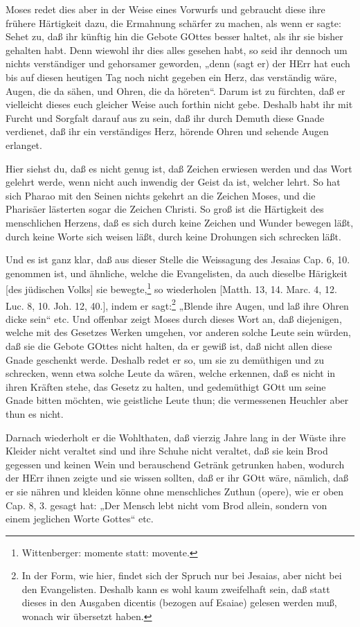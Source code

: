 Moses redet dies aber in der Weise eines Vorwurfs und gebraucht diese ihre frühere Härtigkeit dazu, die Ermahnung schärfer zu machen, als wenn er sagte: Sehet zu, daß ihr künftig hin die Gebote GOttes besser haltet, als ihr sie bisher gehalten habt. Denn wiewohl ihr dies alles gesehen habt, so seid ihr dennoch um nichts verständiger und gehorsamer geworden, „denn (sagt er) der HErr hat euch bis auf diesen heutigen Tag noch nicht gegeben ein Herz, das verständig wäre, Augen, die da sähen, und Ohren, die da höreten“. Darum ist zu fürchten, daß er vielleicht dieses euch gleicher Weise auch forthin nicht gebe. Deshalb habt ihr mit Furcht und Sorgfalt darauf aus zu sein, daß ihr durch Demuth diese Gnade verdienet, daß ihr ein verständiges Herz, hörende Ohren und sehende Augen erlanget.

Hier siehst du, daß es nicht genug ist, daß Zeichen erwiesen werden und das Wort gelehrt werde, wenn nicht auch inwendig der Geist da ist, welcher lehrt. So hat sich Pharao mit den Seinen nichts gekehrt an die Zeichen Moses, und die Pharisäer lästerten sogar die Zeichen Christi. So groß ist die Härtigkeit des menschlichen
Herzens, daß es sich durch keine Zeichen und Wunder bewegen läßt, durch keine Worte sich weisen läßt, durch keine Drohungen sich schrecken läßt.

Und es ist ganz klar, daß aus dieser Stelle die Weissagung des Jesaias Cap. 6, 10. genommen ist, und ähnliche, welche die Evangelisten, da auch dieselbe Härigkeit [des jüdischen Volks] sie bewegte,\footnote{Wittenberger: momente statt: movente.} so wiederholen [Matth. 13, 14. Marc. 4, 12. Luc. 8, 10. Joh. 12, 40.], indem er sagt:\footnote{In der Form, wie hier, findet sich der Spruch nur bei Jesaias, aber nicht bei den Evangelisten. Deshalb kann es wohl kaum zweifelhaft sein, daß statt dieses in den Ausgaben dicentis (bezogen auf Esaiae) gelesen werden muß, wonach wir übersetzt haben.} „Blende ihre Augen, und laß ihre Ohren dicke sein“ etc. Und offenbar zeigt Moses durch dieses Wort an, daß diejenigen, welche mit des Gesetzes Werken umgehen, vor anderen solche Leute sein würden, daß sie die Gebote GOttes nicht halten, da er gewiß ist, daß nicht allen diese Gnade geschenkt werde. Deshalb redet er so, um sie zu demüthigen und zu schrecken, wenn etwa solche Leute da wären, welche erkennen, daß es nicht in ihren Kräften stehe, das Gesetz zu halten, und gedemüthigt GOtt um seine Gnade bitten möchten, wie geistliche Leute thun; die vermessenen Heuchler aber thun es nicht.

Darnach wiederholt er die Wohlthaten, daß vierzig Jahre lang in der Wüste ihre Kleider nicht veraltet sind und ihre Schuhe nicht veraltet, daß sie kein Brod gegessen und keinen Wein und berauschend Getränk getrunken haben, wodurch der HErr ihnen zeigte und sie wissen sollten, daß er ihr GOtt wäre, nämlich, daß er sie nähren und kleiden könne ohne menschliches Zuthun (opere), wie er oben Cap. 8, 3. gesagt hat: „Der Mensch lebt nicht vom Brod allein, sondern von einem jeglichen Worte Gottes“ etc.

